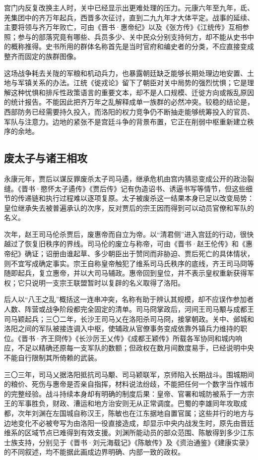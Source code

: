 宫门内反复改换主人时，关中已经显示出更难处理的压力。元康六年至九年，氐、羌集团中的齐万年起兵，西晋多次征讨，直到二九九年才大体平定。战事的延续、主要将领与齐万年败亡，可由《晋书·惠帝纪》以及《张方传》《江统传》互相参照；参与的部落究竟有哪些、兵员多少、关中民众分别支持何方，却不能从史书中的概称推得。史书所用的群体名称首先是当时官府和编史者的分类，不应直接变成整齐而固定的族群图像。

这场战争耗去关陇的军粮和机动兵力，也暴露朝廷缺乏能够长期处理边地安置、土地与军镇关系的办法。江统《徙戎论》留下了朝臣对关中局势的强烈忧惧；它是理解这种忧惧和排斥性政策语言的重要文本，却不是人口规模、迁徙方向或叛乱原因的统计报告。不能因此把齐万年之乱解释成单一族群的必然冲突。较稳的结论是，西部防务已经需要持久投入，而洛阳的权力竞争仍不断抽走能够统筹投入的官员、军队与注意力。边地的紧张不是宫廷斗争的背景布置，它正在削弱中枢重新建立秩序的余地。

\subsection{废太子与诸王相攻}

永康元年，贾后以谋反罪废杀太子司马遹，继承危机由宫内猜忌变成公开的政治裂缝。《晋书·愍怀太子遹传》《贾后传》记有伪造诏书、诱逼书写等情节，但这些细节的传递链和执行过程难以逐项复原。太子被废杀这一结果本身已足以改变局势：皇位继承失去被普遍承认的次序，反对贾后的宗王因而得到可以动员官僚和军队的名义。

次年，赵王司马伦杀贾后，废惠帝而自立为帝。以“清君侧”进入宫廷的行动，很快越过了恢复旧秩序的界线。司马伦的废立与称帝，可由《晋书·赵王伦传》和《惠帝纪》确证；诏册由谁起草、多少朝臣出于赞同而非胁迫、贾后死亡的具体情状，则不宜写成确定事实。宗王自称皇帝触犯了维系司马氏秩序的底线，齐王司马冏等随即起兵，复立惠帝，并以大司马辅政。惠帝回到皇位，并不表示皇权重新获得军权；它只说明一支宗王联盟暂时以复辟的名义取得了洛阳。

后人以“八王之乱”概括这一连串冲突，名称有助于辨认其规模，却不应误作参加者人数、阵营或战争阶段都完全固定的清单。司马冏掌政后，河间王司马颙与成都王司马颖起兵；三〇二年，长沙王司马乂在洛阳杀司马冏，接掌朝政。关中、邺城和洛阳之间的军队被接连调入中枢，使辅政从官僚事务变成依靠外镇兵力维持的职位。《晋书·齐王冏传》《长沙厉王乂传》《成都王颖传》所载各军协同和城内响应，不足以精确还原每一支军队的数额；但政权在数月间数度易手，已经说明中央不能自行限制其所倚赖的武装。

三〇三年，司马乂据洛阳抵抗司马颙、司马颖联军，京师陷入长期战斗。围城期间的粮价、死伤与惠帝是否亲自指挥，材料说法纷歧，不能把任何一个数字当作城市的完整经验。战斗持续本身却有明确的制度后果：皇帝、官署和城防被系于一方宗王的军事胜负，财政、漕运和地方治安则无从正常调度。巴蜀的李雄同年攻取成都，次年刘渊在左国城自称汉王，陈敏也在江东据地自置官属；这些并行的地方与边地变化不必被夸写为由洛阳一役直接造成，却显示中央内战发生时，原先由晋廷维系的区域节点已难得到有效支援。刘渊所能动员的部众范围、陈敏得到多少江东士族支持，分别见于《晋书·刘元海载记》《陈敏传》及《资治通鉴》《建康实录》的不同叙述，均不能据此画成边界明确、内部一致的政权。

